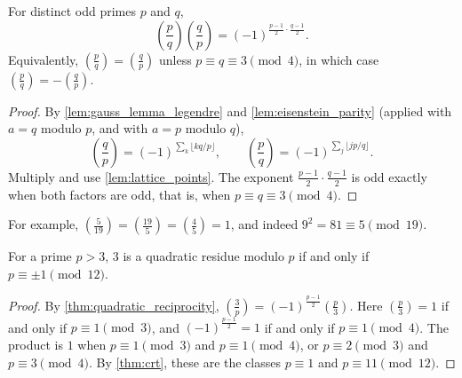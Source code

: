 \begin{theorem}\label{thm:quadratic_reciprocity}
    For distinct odd primes $p$ and $q$,
    \begin{equation*}
        \left(\frac{p}{q}\right)\left(\frac{q}{p}\right) = (-1)^{\frac{p-1}{2}\cdot\frac{q-1}{2}}.
    \end{equation*}
    Equivalently, $\left(\frac{p}{q}\right) = \left(\frac{q}{p}\right)$ unless $p \equiv q \equiv 3 \pmod 4$, in which case $\left(\frac{p}{q}\right) = -\left(\frac{q}{p}\right)$.
\end{theorem}
\begin{proof}
    By \cref{lem:gauss_lemma_legendre} and \cref{lem:eisenstein_parity} (applied with $a = q$ modulo $p$, and with $a = p$ modulo $q$),
    \begin{equation*}
        \left(\frac{q}{p}\right) = (-1)^{\sum_{k} \lfloor kq/p \rfloor}, \qquad \left(\frac{p}{q}\right) = (-1)^{\sum_{j} \lfloor jp/q \rfloor}.
    \end{equation*}
    Multiply and use \cref{lem:lattice_points}. The exponent $\frac{p-1}{2}\cdot\frac{q-1}{2}$ is odd exactly when both factors are odd, that is, when $p \equiv q \equiv 3 \pmod 4$.
\end{proof}

For example, $\left(\frac{5}{19}\right) = \left(\frac{19}{5}\right) = \left(\frac{4}{5}\right) = 1$, and indeed $9^2 = 81 \equiv 5 \pmod{19}$.

\begin{corollary}\label{cor:legendre_three}
    For a prime $p > 3$, $3$ is a quadratic residue modulo $p$ if and only if $p \equiv \pm 1 \pmod{12}$.
\end{corollary}
\begin{proof}
    By \cref{thm:quadratic_reciprocity}, $\left(\frac{3}{p}\right) = (-1)^{\frac{p-1}{2}}\left(\frac{p}{3}\right)$. Here $\left(\frac{p}{3}\right) = 1$ if and only if $p \equiv 1 \pmod 3$, and $(-1)^{\frac{p-1}{2}} = 1$ if and only if $p \equiv 1 \pmod 4$. The product is $1$ when $p \equiv 1 \pmod 3$ and $p \equiv 1 \pmod 4$, or $p \equiv 2 \pmod 3$ and $p \equiv 3 \pmod 4$. By \cref{thm:crt}, these are the classes $p \equiv 1$ and $p \equiv 11 \pmod{12}$.
\end{proof}
